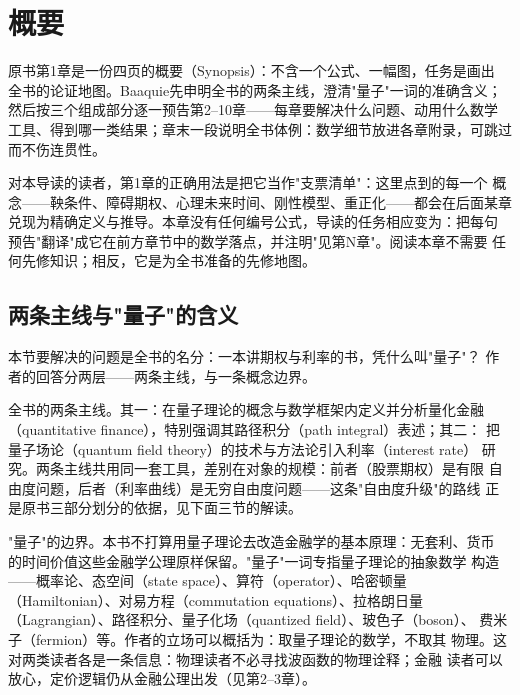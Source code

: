 \chapter{概要}

原书第1章是一份四页的概要（Synopsis）：不含一个公式、一幅图，任务是画出
全书的论证地图。Baaquie先申明全书的两条主线，澄清"量子"一词的准确含义；
然后按三个组成部分逐一预告第2--10章——每章要解决什么问题、动用什么数学
工具、得到哪一类结果；章末一段说明全书体例：数学细节放进各章附录，可跳过
而不伤连贯性。

对本导读的读者，第1章的正确用法是把它当作"支票清单"：这里点到的每一个
概念——鞅条件、障碍期权、心理未来时间、刚性模型、重正化——都会在后面某章
兑现为精确定义与推导。本章没有任何编号公式，导读的任务相应变为：把每句
预告"翻译"成它在前方章节中的数学落点，并注明"见第N章"。阅读本章不需要
任何先修知识；相反，它是为全书准备的先修地图。

\section{两条主线与"量子"的含义}

本节要解决的问题是全书的名分：一本讲期权与利率的书，凭什么叫"量子"？
作者的回答分两层——两条主线，与一条概念边界。

全书的两条主线。其一：在量子理论的概念与数学框架内定义并分析量化金融
（quantitative finance），特别强调其路径积分（path integral）表述；其二：
把量子场论（quantum field theory）的技术与方法论引入利率（interest rate）
研究。两条主线共用同一套工具，差别在对象的规模：前者（股票期权）是有限
自由度问题，后者（利率曲线）是无穷自由度问题——这条"自由度升级"的路线
正是原书三部分划分的依据，见下面三节的解读。

"量子"的边界。本书不打算用量子理论去改造金融学的基本原理：无套利、货币
的时间价值这些金融学公理原样保留。"量子"一词专指量子理论的抽象数学
构造——概率论、态空间（state space）、算符（operator）、哈密顿量
（Hamiltonian）、对易方程（commutation equations）、拉格朗日量
（Lagrangian）、路径积分、量子化场（quantized field）、玻色子（boson）、
费米子（fermion）等。作者的立场可以概括为：取量子理论的数学，不取其
物理。这对两类读者各是一条信息：物理读者不必寻找波函数的物理诠释；金融
读者可以放心，定价逻辑仍从金融公理出发（见第2--3章）。

